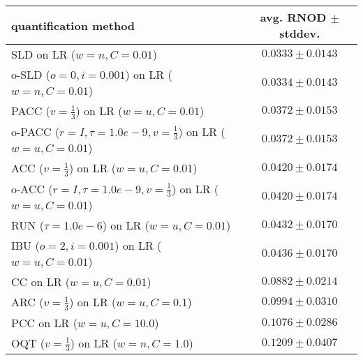 \begin{tabular}{lc}
  \toprule
  quantification method & avg. RNOD $\pm$ stddev. \\
  \midrule
  SLD on LR ($w=n, C=0.01$) & $\mathbf{0.0333 \pm 0.0143}$ \\
  o-SLD ($o=0, i=0.001$) on LR ($w=n, C=0.01$) & $0.0334 \pm 0.0143$ \\
  PACC ($v=\frac{1}{3}$) on LR ($w=u, C=0.01$) & $0.0372 \pm 0.0153$ \\
  o-PACC ($r=I, \tau=1.0e-9, v=\frac{1}{3}$) on LR ($w=u, C=0.01$) & $0.0372 \pm 0.0153$ \\
  ACC ($v=\frac{1}{3}$) on LR ($w=u, C=0.01$) & $0.0420 \pm 0.0174$ \\
  o-ACC ($r=I, \tau=1.0e-9, v=\frac{1}{3}$) on LR ($w=u, C=0.01$) & $0.0420 \pm 0.0174$ \\
  RUN ($\tau=1.0e-6$) on LR ($w=u, C=0.01$) & $0.0432 \pm 0.0170$ \\
  IBU ($o=2, i=0.001$) on LR ($w=u, C=0.01$) & $0.0436 \pm 0.0170$ \\
  CC on LR ($w=u, C=0.01$) & $0.0882 \pm 0.0214$ \\
  ARC ($v=\frac{1}{3}$) on LR ($w=u, C=0.1$) & $0.0994 \pm 0.0310$ \\
  PCC on LR ($w=u, C=10.0$) & $0.1076 \pm 0.0286$ \\
  OQT ($v=\frac{1}{3}$) on LR ($w=n, C=1.0$) & $0.1209 \pm 0.0407$ \\
  \bottomrule
\end{tabular}
